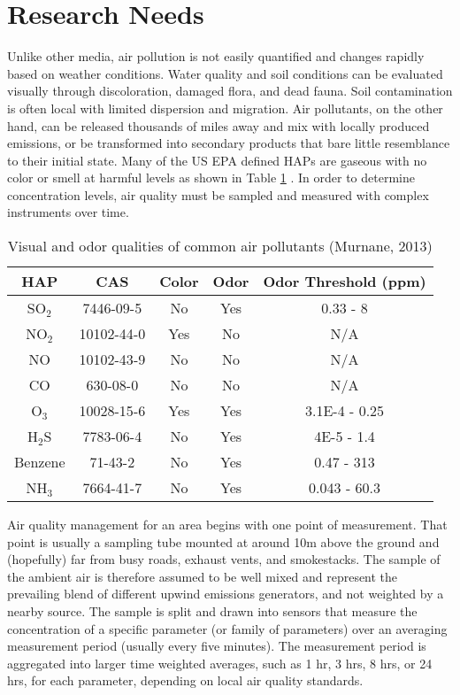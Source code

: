\section{Research Needs}

Unlike other media,  air pollution is not easily quantified and changes rapidly based on weather conditions. Water quality and soil conditions can be evaluated visually through discoloration, damaged flora, and dead fauna. Soil contamination is often local with limited dispersion and migration. Air pollutants, on the other hand, can be released thousands of miles away and mix with locally produced emissions, or be transformed into secondary products that bare little resemblance to their initial state. Many of the US EPA defined HAPs are gaseous with no color or smell at harmful levels as shown in Table \ref{tb:odor} \citep{Murnane2013}. In order to determine concentration levels, air quality must be sampled and measured with complex instruments over time.

\begin{table}[H]
\centering
\caption[Visual and odor qualities of common air pollutants]{Visual and odor qualities of common air pollutants (Murnane, 2013)}
\label{tb:odor}
\begin{tabular}{@{}ccccc@{}}
\toprule
\textbf{HAP} & \textbf{CAS} & \textbf{Color} & \textbf{Odor} & \textbf{Odor Threshold (ppm)} \\ \midrule
SO$_{2}$ & 7446-09-5 & No & Yes & 0.33 - 8 \\
NO$_{2}$ & 10102-44-0 & Yes & No & N/A \\
NO & 10102-43-9 & No & No & N/A \\
CO & 630-08-0 & No & No & N/A \\
O$_{3}$ & 10028-15-6 & Yes & Yes & 3.1E-4 - 0.25 \\
H$_{2}$S & 7783-06-4 & No & Yes & 4E-5 - 1.4 \\
Benzene & 71-43-2 & No & Yes & 0.47 - 313 \\
NH$_{3}$ & 7664-41-7 & No & Yes & 0.043 - 60.3 \\ \bottomrule
\end{tabular}
\end{table}

Air quality management for an area begins with one point of measurement. That point is usually a sampling tube mounted at around 10m above the ground and (hopefully) far from busy roads, exhaust vents, and smokestacks. The sample of the ambient air is therefore assumed to be well mixed and represent the prevailing blend of different upwind emissions generators, and not weighted by a nearby source. The sample is split and drawn into sensors that measure the concentration of a specific parameter (or family of parameters) over an averaging measurement period (usually every five minutes). The measurement period is aggregated into larger time weighted averages, such as 1 hr, 3 hrs, 8 hrs, or 24 hrs, for each parameter, depending on local air quality standards. 

